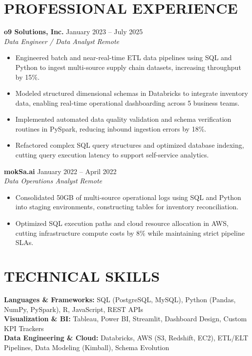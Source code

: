 \documentclass[11pt,letterpaper]{article}
\begin{document}
\section*{PROFESSIONAL EXPERIENCE}
\noindent\small \textbf{o9 Solutions, Inc.} \hfill January 2023 -- July 2025 \\
\textit{Data Engineer / Data Analyst} \hfill \textit{Remote}
\begin{itemize}
\item Engineered batch and near-real-time ETL data pipelines using SQL and Python to ingest multi-source supply chain datasets, increasing throughput by 15\%.
\item Modeled structured dimensional schemas in Databricks to integrate inventory data, enabling real-time operational dashboarding across 5 business teams.
\item Implemented automated data quality validation and schema verification routines in PySpark, reducing inbound ingestion errors by 18\%.
\item Refactored complex SQL query structures and optimized database indexing, cutting query execution latency to support self-service analytics.
\end{itemize}
\noindent\small \textbf{mokSa.ai} \hfill January 2022 -- April 2022 \\
\textit{Data Operations Analyst} \hfill \textit{Remote}
\begin{itemize}
\item Consolidated 50GB of multi-source operational logs using SQL and Python into staging environments, constructing tables for inventory reconciliation.
\item Optimized SQL execution paths and cloud resource allocation in AWS, cutting infrastructure compute costs by 8\% while maintaining strict pipeline SLAs.
\end{itemize}
\section*{TECHNICAL SKILLS}
\noindent\small \textbf{Languages \& Frameworks:} SQL (PostgreSQL, MySQL), Python (Pandas, NumPy, PySpark), R, JavaScript, REST APIs \\
\textbf{Visualization \& BI:} Tableau, Power BI, Streamlit, Dashboard Design, Custom KPI Trackers \\
\textbf{Data Engineering \& Cloud:} Databricks, AWS (S3, Redshift, EC2), ETL/ELT Pipelines, Data Modeling (Kimball), Schema Evolution
\end{document}
